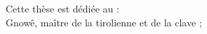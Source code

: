 
\begin{dedicace}
Cette thèse est dédiée au :\\

	Gnowê, maître de la tirolienne et de la clave ;\\

\end{dedicace}

\begin{epigraphe}
\end{epigraphe}


